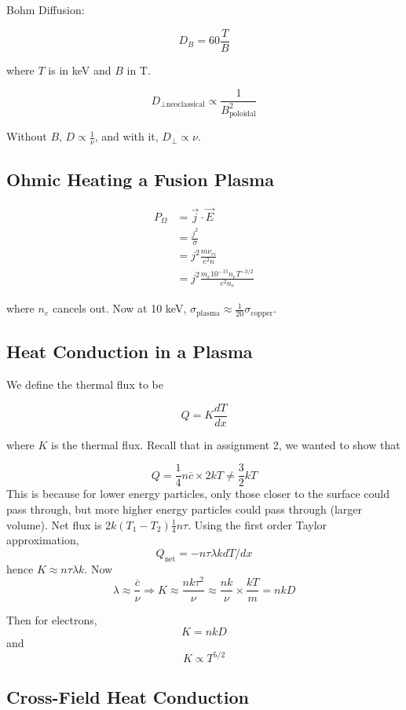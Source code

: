 \documentclass[12pt]{article}
\begin{document}
Bohm Diffusion:

$$D_B = 60 \frac{T}{B}$$

where $T$ is in keV and $B$ in T.

$$D_{\perp\text{neoclassical}} \propto \frac{1}{B_{\text{poloidal}}^2}$$

Without $B$, $D \propto \frac{1}{\nu}$, and with it, $D_\perp \propto \nu$.

\subsection{Ohmic Heating a Fusion Plasma}

\begin{align*}
    P_\Omega &= \vec j \cdot \vec E \\
             &= \frac{j^2}{\sigma} \\
             &= j^2 \frac{m\nu_{ei}}{e^2n} \\
             &= j^2 \frac{m_e10^{-15}n_eT^{-3/2}}{e^2n_e}
\end{align*}

where $n_e$ cancels out. Now at 10 keV, $\sigma_{\text{plasma}} \approx \frac{1}{20} \sigma_{\text{copper}}$.

\subsection{Heat Conduction in a Plasma}

We define the thermal flux to be

$$Q = K \frac{dT}{dx}$$

where $K$ is the thermal flux. Recall that in assignment 2, we wanted to show that

$$Q = \frac{1}{4} n\overline c \times 2kT \neq \frac{3}{2}kT$$
This is because for lower energy particles, only those closer to the surface could pass through, but more higher energy particles could pass through (larger volume). Net flux is  $2k(T_1-T_2)\frac{1}{4} n\tau$. Using the first order Taylor approximation,
$$Q_{\text{net}} = -n\tau\lambda k dT/dx$$
hence $K \approx n\tau\lambda k$. Now
$$\lambda \approx \frac{\overline c}{\nu} \Rightarrow K \approx \frac{nk\tau^2}{\nu} \approx \frac{nk}{\nu} \times \frac{kT}{m} = nkD$$

Then for electrons,
$$K = nkD$$
and
$$K \propto T^{5/2}$$

\subsection{Cross-Field Heat Conduction}
\end{document}
